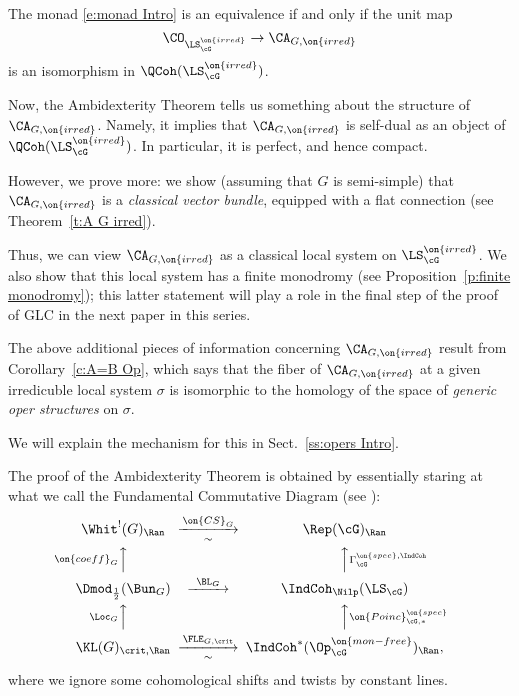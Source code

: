 \documentclass[9pt]{amsart}
\theoremstyle{remark}
\theoremstyle{definition}
\theoremstyle{remark}
\newcommand{\thmref}[1]{Theorem~\ref{#1}}
\newcommand{\secref}[1]{Sect.~\ref{#1}}
\newcommand{\propref}[1]{Proposition~\ref{#1}}
\newcommand{\corref}[1]{Corollary~\ref{#1}}
\numberwithin{equation}{section}
\begin{document}
The monad \eqref{e:monad Intro} is an equivalence if and only if the unit map
\begin{equation} \label{e:unit Intro}
\CO_{\LS^{\on{irred}}_\cG}\to \CA_{G,\on{irred}}
\end{equation} 
is an isomorphism in $\QCoh(\LS^{\on{irred}}_\cG)$.

\sssec{}

Now, the Ambidexterity Theorem tells us something about the structure of $\CA_{G,\on{irred}}$. Namely, it implies
that $\CA_{G,\on{irred}}$ is self-dual as an object of $\QCoh(\LS^{\on{irred}}_\cG)$. In particular, it is 
perfect, and hence compact. 

\medskip

However, we prove more: we show (assuming that $G$ is semi-simple) that
$\CA_{G,\on{irred}}$ is a \emph{classical vector bundle}, equipped with a flat connection 
(see \thmref{t:A G irred}).

\medskip

Thus, we can view $\CA_{G,\on{irred}}$ as a classical local system on $\LS^{\on{irred}}_\cG$.
We also show that this local system has a finite monodromy (see \propref{p:finite monodromy});
this latter statement will play a role in the final step of the proof of GLC in the next paper in this
series. 

\sssec{} \label{sss:opers Intro}

The above additional pieces of information concerning $\CA_{G,\on{irred}}$ result from \corref{c:A=B Op}, which says that the fiber
of $\CA_{G,\on{irred}}$ at a given irredicuble local system $\sigma$ is isomorphic to the homology of
the space of \emph{generic oper structures} on $\sigma$.  

\medskip

We will explain the mechanism for this in \secref{ss:opers Intro}. 


\sssec{}

The proof of the Ambidexterity Theorem is obtained by essentially staring at what we call the Fundamental Commutative Diagram
(see \cite[Diagram (18.14)]{GLC2}):
\begin{equation} \label{e:FCD}
\CD
\Whit^!(G)_\Ran @>{\on{CS}_G}>{\sim}>  \Rep(\cG)_\Ran \\
@A{\on{coeff}_G}AA @AA{\Gamma^{\on{spec},\IndCoh}_\cG}A \\
\Dmod_{\frac{1}{2}}(\Bun_G) @>{\BL_G}>>  \IndCoh_\Nilp(\LS_\cG) \\
@A{\Loc_G}AA @AA{\on{Poinc}^{\on{spec}}_{\cG,*}}A \\
\KL(G)_{\crit,\Ran} @>{\FLE_{G,\crit}}>{\sim}> \IndCoh^*(\Op^{\on{mon-free}}_\cG)_\Ran,
\endCD
\end{equation}
where we ignore some cohomological shifts and twists by constant lines.  
\end{document}
